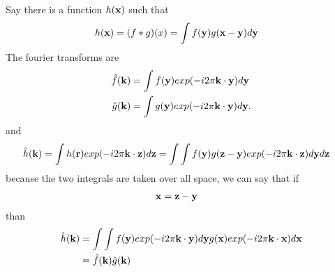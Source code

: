 Say there is a function $h(\textbf{x})$ such that
\begin{align}
  h(\textbf{x}) &= (f\ast g)(x) = \int f(\textbf{y})g(\textbf{x}-\textbf{y})d\textbf{y}
\end{align}
The fourier transforms are
\begin{align}
  \hat{f}(\textbf{k}) &= \int f(\textbf{y}) exp(-i2\pi \textbf{k} \cdot \textbf{y})d\textbf{y} \\
  \hat{g}(\textbf{k}) &= \int g(\textbf{y}) exp(-i2\pi \textbf{k} \cdot \textbf{y})d\textbf{y}.
\end{align}
and
\begin{align}
  \hat{h}(\textbf{k}) = \int h(\textbf{r}) exp(-i2\pi \textbf{k} \cdot \textbf{z}) d\textbf{z} &= \int \int f(\textbf{y}) g(\textbf{z}-\textbf{y}) exp(-i2\pi \textbf{k} \cdot \textbf{z}) d\textbf{y} d\textbf{z}
\end{align}
because the two integrals are taken over all space, we can say that if
\begin{align}
\textbf{x} &= \textbf{z} - \textbf{y}
\end{align}
than
\begin{align}
\hat{h}(\textbf{k}) &= \int \int f(\textbf{y}) exp(-i2\pi \textbf{k} \cdot \textbf{y} ) d\textbf{y} g(\textbf{x}) exp(-i2\pi \textbf{k} \cdot \textbf{x}) d\textbf{x} \\
&= \hat{f}(\textbf{k}) \hat{g}(\textbf{k})
\end{align}


